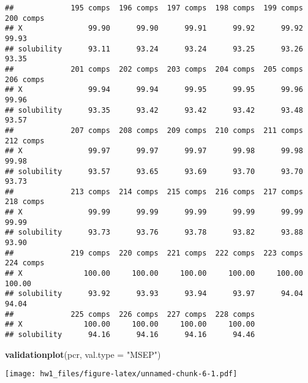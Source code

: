 \documentclass[
]{article}
\newenvironment{Shaded}{\begin{snugshade}}{\end{snugshade}}
\newcommand{\DataTypeTok}[1]{\textcolor[rgb]{0.13,0.29,0.53}{#1}}
\newcommand{\DecValTok}[1]{\textcolor[rgb]{0.00,0.00,0.81}{#1}}
\newcommand{\KeywordTok}[1]{\textcolor[rgb]{0.13,0.29,0.53}{\textbf{#1}}}
\newcommand{\NormalTok}[1]{#1}
\newcommand{\OperatorTok}[1]{\textcolor[rgb]{0.81,0.36,0.00}{\textbf{#1}}}
\newcommand{\StringTok}[1]{\textcolor[rgb]{0.31,0.60,0.02}{#1}}
\begin{document}
\begin{verbatim}
##             195 comps  196 comps  197 comps  198 comps  199 comps  200 comps
## X               99.90      99.90      99.91      99.92      99.92      99.93
## solubility      93.11      93.24      93.24      93.25      93.26      93.35
##             201 comps  202 comps  203 comps  204 comps  205 comps  206 comps
## X               99.94      99.94      99.95      99.95      99.96      99.96
## solubility      93.35      93.42      93.42      93.42      93.48      93.57
##             207 comps  208 comps  209 comps  210 comps  211 comps  212 comps
## X               99.97      99.97      99.97      99.98      99.98      99.98
## solubility      93.57      93.65      93.69      93.70      93.70      93.73
##             213 comps  214 comps  215 comps  216 comps  217 comps  218 comps
## X               99.99      99.99      99.99      99.99      99.99      99.99
## solubility      93.73      93.76      93.78      93.82      93.88      93.90
##             219 comps  220 comps  221 comps  222 comps  223 comps  224 comps
## X              100.00     100.00     100.00     100.00     100.00     100.00
## solubility      93.92      93.93      93.94      93.97      94.04      94.04
##             225 comps  226 comps  227 comps  228 comps
## X              100.00     100.00     100.00     100.00
## solubility      94.16      94.16      94.16      94.46
\end{verbatim}

\begin{Shaded}
\begin{Highlighting}[]
\KeywordTok{validationplot}\NormalTok{(pcr, }\DataTypeTok{val.type =} \StringTok{"MSEP"}\NormalTok{)}
\end{Highlighting}
\end{Shaded}

\texttt{[image: hw1\_files/figure-latex/unnamed-chunk-6-1.pdf]}

\begin{Shaded}
\end{Shaded}
\end{document}

